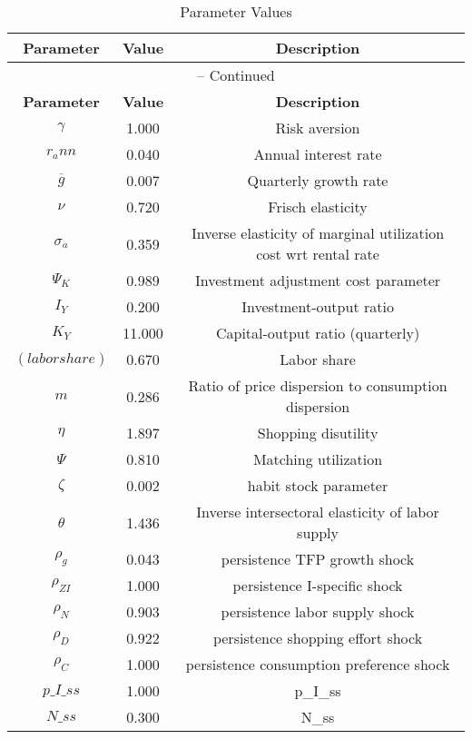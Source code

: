 \begin{center}
\begin{longtable}{ccc}
\caption{Parameter Values}\\%
\toprule%
\multicolumn{1}{c}{\textbf{Parameter}} &
\multicolumn{1}{c}{\textbf{Value}} &
 \multicolumn{1}{c}{\textbf{Description}}\\%
\midrule%
\endfirsthead
\multicolumn{3}{c}{{\tablename} \thetable{} -- Continued}\\%
\midrule%
\multicolumn{1}{c}{\textbf{Parameter}} &
\multicolumn{1}{c}{\textbf{Value}} &
  \multicolumn{1}{c}{\textbf{Description}}\\%
\midrule%
\endhead
${\gamma}$ 	 & 	 1.000 	 & 	 Risk aversion\\
${r_ann}$ 	 & 	 0.040 	 & 	 Annual interest rate\\
${\overline{g}}$ 	 & 	 0.007 	 & 	 Quarterly growth rate\\
$\nu$ 	 & 	 0.720 	 & 	 Frisch elasticity\\
${\sigma_a}$ 	 & 	 0.359 	 & 	 Inverse elasticity of marginal utilization cost wrt rental rate\\
${\Psi_K}$ 	 & 	 0.989 	 & 	 Investment adjustment cost parameter\\
${I_Y}$ 	 & 	 0.200 	 & 	 Investment-output ratio\\
${K_Y}$ 	 & 	 11.000 	 & 	 Capital-output ratio (quarterly)\\
$(labor share)$ 	 & 	 0.670 	 & 	 Labor share\\
${m}$ 	 & 	 0.286 	 & 	 Ratio of price dispersion to consumption dispersion\\
${\eta}$ 	 & 	 1.897 	 & 	 Shopping disutility\\
${\Psi}$ 	 & 	 0.810 	 & 	 Matching utilization\\
${\zeta}$ 	 & 	 0.002 	 & 	 habit stock parameter\\
${\theta}$ 	 & 	 1.436 	 & 	 Inverse intersectoral elasticity of labor supply\\
${\rho_g}$ 	 & 	 0.043 	 & 	 persistence TFP growth shock\\
${\rho_{ZI}}$ 	 & 	 1.000 	 & 	 persistence I-specific shock\\
${\rho_N}$ 	 & 	 0.903 	 & 	 persistence labor supply shock\\
${\rho_D}$ 	 & 	 0.922 	 & 	 persistence shopping effort shock\\
${\rho_C}$ 	 & 	 1.000 	 & 	 persistence consumption preference shock\\
$p\_I\_ss$ 	 & 	 1.000 	 & 	 p\_I\_ss\\
$N\_ss$ 	 & 	 0.300 	 & 	 N\_ss\\
\bottomrule%
\end{longtable}
\end{center}
